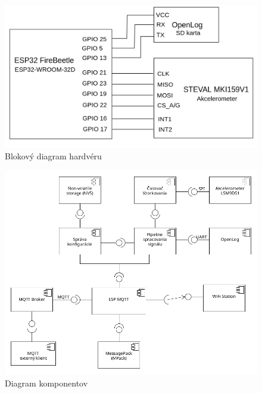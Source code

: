 \begin{figure}[h]
	\centering
	\includegraphics[width=\textwidth]{figures/block-circuit-diagram.png}
	\caption{Blokový diagram hardvéru}
	\label{fig:design}
\end{figure}

\begin{figure}[h]
	\centering
	\includegraphics[width=\textwidth]{figures/components.png}
	\caption{Diagram komponentov}
	\label{fig:design}
\end{figure}

